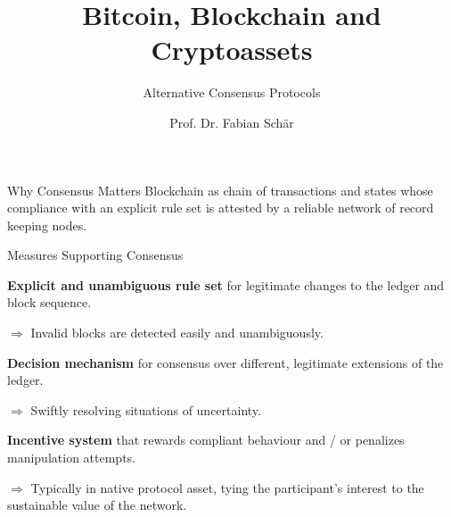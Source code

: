 \documentclass[handout]{beamer}
\title{Bitcoin, Blockchain and Cryptoassets}
\subtitle{Alternative Consensus Protocols}
\author{Prof. Dr. Fabian Schär}
\institute{University of Basel}
\begin{document}
	
	\thispagestyle{empty}
	\begin{frame}[noframenumbering]
		\titlepage
	\end{frame}
	
	
	\begin{frame}{Why Consensus Matters}
		Blockchain as \color{focus} chain of transactions and states \color{black} whose \color{focus} compliance with an explicit rule set \color{black} is  attested by a reliable network of record keeping nodes.
		
		
	\end{frame}
	
	\begin{frame}{Measures Supporting Consensus}
		
		\textbf{Explicit and unambiguous rule set} for legitimate changes to the ledger and block sequence.
		\vspace{0.25 em}
		
		$\Rightarrow$ Invalid blocks are detected easily and unambiguously.
		\vspace{1.5 em}
		
		\textbf{Decision mechanism} for consensus over different, legitimate extensions of the ledger. 
		\vspace{0.25 em}
		
		$\Rightarrow$ Swiftly resolving situations of uncertainty.
		\vspace{1.5 em}
		
		\textbf{Incentive system} that rewards compliant behaviour and / or penalizes manipulation attempts.
		\vspace{0.25 em}
		
		$\Rightarrow$ Typically in native protocol asset, tying the participant's interest to the sustainable value of the network.
		
	\end{frame}
	
\end{document}
